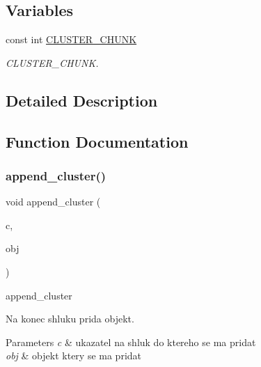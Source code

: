 \subsection*{Variables}
\begin{DoxyCompactItemize}
\item 
const int \hyperlink{group__Prace__se__shluky_gafb09f2bf4615f5ac7a91807aa086d4c3}{C\+L\+U\+S\+T\+E\+R\+\_\+\+C\+H\+U\+NK}
\begin{DoxyCompactList}\small\item\em C\+L\+U\+S\+T\+E\+R\+\_\+\+C\+H\+U\+NK. \end{DoxyCompactList}\end{DoxyCompactItemize}


\subsection{Detailed Description}


\subsection{Function Documentation}
\hypertarget{group__Prace__se__shluky_gab6269b64b2c7f4842a51c58b2d86a2e5}{}\label{group__Prace__se__shluky_gab6269b64b2c7f4842a51c58b2d86a2e5} 
\subsubsection{\texorpdfstring{append\+\_\+cluster()}{append\_cluster()}}
{\footnotesize\ttfamily void append\+\_\+cluster (\begin{DoxyParamCaption}\item[{struct \hyperlink{structcluster__t}{cluster\+\_\+t} $\ast$}]{c,  }\item[{struct \hyperlink{structobj__t}{obj\+\_\+t}}]{obj }\end{DoxyParamCaption})}



append\+\_\+cluster 

Na konec shluku prida objekt. 
\begin{DoxyParams}{Parameters}
{\em c} & ukazatel na shluk do ktereho se ma pridat \\
\hline
{\em obj} & objekt ktery se ma pridat \\
\hline
\end{DoxyParams}
\hypertarget{group__Prace__se__shluky_ga8289f092f205baeb13cf33cfffa15324}{}\label{group__Prace__se__shluky_ga8289f092f205baeb13cf33cfffa15324} 
